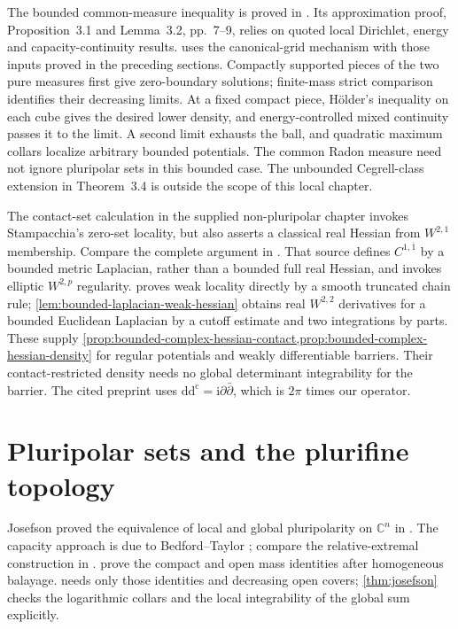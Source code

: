 The bounded common-measure inequality is proved in \cite[Theorem 3.3, p.~9]{Din07MixedV1}. Its approximation proof, Proposition~3.1 and Lemma~3.2, pp.~7--9, relies on quoted local Dirichlet, energy and capacity-continuity results.  uses the canonical-grid mechanism with those inputs proved in the preceding sections. Compactly supported pieces of the two pure measures first give zero-boundary solutions; finite-mass strict comparison identifies their decreasing limits. At a fixed compact piece, H\"older's inequality on each cube gives the desired lower density, and energy-controlled mixed continuity passes it to the limit. A second limit exhausts the ball, and quadratic maximum collars localize arbitrary bounded potentials. The common Radon measure need not ignore pluripolar sets in this bounded case. The unbounded Cegrell-class extension in Theorem~3.4 is outside the scope of this local chapter.

The contact-set calculation in the supplied non-pluripolar chapter \cite[Lemma \texttt{DNTroof}, Step 1]{XiaSampleBook} invokes Stampacchia's zero-set locality, but also asserts a classical real Hessian from $W^{2,1}$ membership. Compare the complete argument in \cite[Lemma 3.1 and Theorem 3.2, pp.~4--8]{DNT2019v1}. That source defines $C^{1,\overline1}$ by a bounded metric Laplacian, rather than a bounded full real Hessian, and invokes elliptic $W^{2,p}$ regularity.  proves weak locality directly by a smooth truncated chain rule; \cref{lem:bounded-laplacian-weak-hessian} obtains real $W^{2,2}$ derivatives for a bounded Euclidean Laplacian by a cutoff estimate and two integrations by parts. These supply \cref{prop:bounded-complex-hessian-contact,prop:bounded-complex-hessian-density} for regular potentials and weakly differentiable barriers. Their contact-restricted density needs no global determinant integrability for the barrier. The cited preprint uses $\mathrm{dd}^{\mathrm c}=\mathrm i\partial\bar\partial$, which is $2\pi$ times our operator.


\section{Pluripolar sets and the plurifine topology}
\label{sec:history-pluripolar}
Josefson proved the equivalence of local and global pluripolarity on $\mathbb C^n$ in \cite{Jos78}. The capacity approach is due to Bedford--Taylor \cite{BT82}; compare the relative-extremal construction in \cite[Theorem 4.32, pp.~118--119, Theorem 4.34, pp.~119--121, and Theorem 4.40 and Corollary 4.41, pp.~124--125]{GZ17}.  prove the compact and open mass identities after homogeneous balayage.  needs only those identities and decreasing open covers; \cref{thm:josefson} checks the logarithmic collars and the local integrability of the global sum explicitly.


